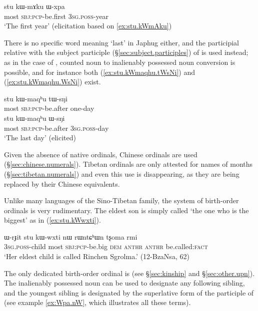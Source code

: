 \begin{exe}
\ex  \label{ex:stu.kWmAku.Wxpa}
\gll  stu kɯ-mɤku ɯ-xpa \\
 most \textsc{sbj}:\textsc{pcp}-be.first \textsc{3sg}.\textsc{poss}-year  \\
\glt  `The first year' (elicitation based on \ref{ex:stu.kWmAku})
\end{exe}

There is no specific word meaning `last' in Japhug either, and the participial relative   with the subject participle (§\ref{sec:subject.participles}) of  is used instead; as in the case of , counted noun to inalienably possessed noun conversion is possible, and for instance both (\ref{ex:stu.kWmaqhu.tWsNi}) and (\ref{ex:stu.kWmaqhu.WsNi}) exist.

\begin{exe}
\ex \label{ex:stu.kWmaqhu.tWsNi}
\gll  stu kɯ-maqʰu tɯ-sŋi  \\
 most \textsc{sbj}:\textsc{pcp}-be.after one-day \\
 \ex \label{ex:stu.kWmaqhu.WsNi}
\gll  stu kɯ-maqʰu ɯ-sŋi  \\
 most \textsc{sbj}:\textsc{pcp}-be.after \textsc{3sg}.\textsc{poss}-day \\
\glt `The last day' (elicited)
\end{exe}

Given the absence of native ordinals,  Chinese ordinals are used  (§\ref{sec:chinese.numerals}). Tibetan ordinals are only attested for names of months (§\ref{sec:tibetan.numerals}) and even this use is disappearing, as they are being replaced by their Chinese equivalents.

Unlike many languages of the Sino-Tibetan family, the system of birth-order ordinals is very rudimentary. The eldest son is simply called  `the one who is the biggest' as in (\ref{ex:stu.kWwxti}).

\begin{exe}
\ex  \label{ex:stu.kWwxti}
\gll ɯ-rɟit stu kɯ-wxti nɯ rɯntɕʰɯn tʂoma rmi\\
\textsc{3sg}.\textsc{poss}-child most \textsc{sbj}:\textsc{pcp}-be.big \textsc{dem}  \textsc{anthr} \textsc{anthr} be.called:\textsc{fact}\\
\glt `Her eldest child is called Rinchen Sgrolma.' (12-BzaNsa, 62)
\end{exe}

The only dedicated birth-order ordinal is  (see §\ref{sec:kinship} and §\ref{sec:other.upn}). The inalienably possessed noun  can be used to designate any following sibling, and the youngest sibling is designated by the superlative form of the participle of  (see example \ref{ex:Wpa.nW}, which illustrates all these terms).

